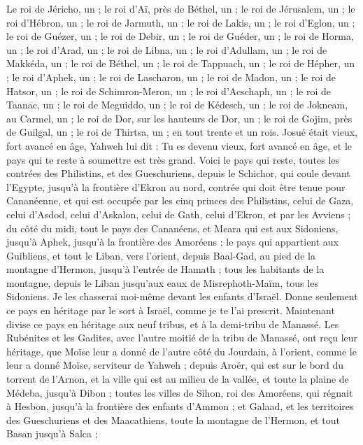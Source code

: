 \begin{multicols}{2}
Le roi de Jéricho, un ; le roi d’Aï, près de Béthel, un ;
le roi de Jérusalem, un ; le roi d’Hébron, un ;
le roi de Jarmuth, un ; le roi de Lakis, un ;
le roi d’Eglon, un ; le roi de Guézer, un ;
le roi de Debir, un ; le roi de Guéder, un ;
le roi de Horma, un ; le roi d’Arad, un ;
le roi de Libna, un ; le roi d’Adullam, un ;
le roi de Makkéda, un ; le roi de Béthel, un ;
le roi de Tappuach, un ; le roi de Hépher, un ;
le roi d’Aphek, un ; le roi de Lascharon, un ;
le roi de Madon, un ; le roi de Hatsor, un ;
le roi de Schimron-Meron, un ; le roi d’Acschaph, un ;
le roi de Taanac, un ; le roi de Meguiddo, un ;
le roi de Kédesch, un ; le roi de Jokneam, au Carmel, un ;
le roi de Dor, sur les hauteurs de Dor, un ; le roi de Gojim, près de Guilgal, un ;
le roi de Thirtsa, un ; en tout trente et un rois.
\VerseOne{}Josué était vieux, fort avancé en âge, Yahweh lui dit : Tu es devenu vieux, fort avancé en âge, et le pays qui te reste à soumettre est très grand.
Voici le pays qui reste, toutes les contrées des Philistins, et des Gueschuriens,
depuis le Schichor, qui coule devant l’Egypte, jusqu’à la frontière d’Ekron au nord, contrée qui doit être tenue pour Cananéenne, et qui est occupée par les cinq princes des Philistins, celui de Gaza, celui d’Asdod, celui d’Askalon, celui de Gath, celui d’Ekron, et par les Avviens ;
du côté du midi, tout le pays des Cananéens, et Meara qui est aux Sidoniens, jusqu’à Aphek, jusqu’à la frontière des Amoréens ;
le pays qui appartient aux Guibliens, et tout le Liban, vers l’orient, depuis Baal-Gad, au pied de la montagne d’Hermon, jusqu’à l’entrée de Hamath ;
tous les habitants de la montagne, depuis le Liban jusqu’aux eaux de Misrephoth-Maïm, tous les Sidoniens. Je les chasserai moi-même devant les enfants d’Israël. Donne seulement ce pays en héritage par le sort à Israël, comme je te l’ai prescrit.
Maintenant divise ce pays en héritage aux neuf tribus, et à la demi-tribu de Manassé.
Les Rubénites et les Gadites, avec l’autre moitié de la tribu de Manassé, ont reçu leur héritage, que Moïse leur a donné de l’autre côté du Jourdain, à l’orient, comme le leur a donné Moïse, serviteur de Yahweh ;
depuis Aroër, qui est sur le bord du torrent de l’Arnon, et la ville qui est au milieu de la vallée, et toute la plaine de Médeba, jusqu’à Dibon ;
toutes les villes de Sihon, roi des Amoréens, qui régnait à Hesbon, jusqu’à la frontière des enfants d’Ammon ;
et Galaad, et les territoires des Gueschuriens et des Maacathiens, toute la montagne de l’Hermon, et tout Basan jusqu’à Salca ;

\end{multicols}
